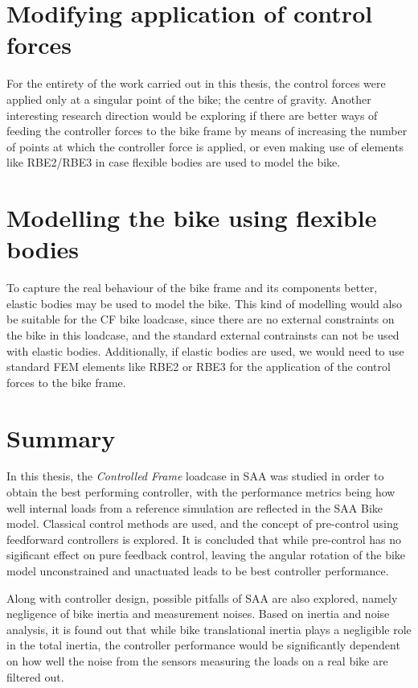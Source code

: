  \section{Modifying application of control forces}
 For the entirety of the work carried out in this thesis, the control forces were applied only at a singular point of the bike; the centre of gravity. Another interesting research direction would be exploring if there are better ways of feeding the controller forces to the bike frame by means of increasing the number of points at which the controller force is applied, or even making use of elements like RBE2/RBE3 in case flexible bodies are used to model the bike.
 
 \section{Modelling the bike using flexible bodies}
 To capture the real behaviour of the bike frame and its components better, elastic bodies may be used to model the bike. This kind of modelling would also be suitable for the CF bike loadcase, since there are no external constraints on the bike in this loadcase, and the standard external contrainsts can not be used with elastic bodies. Additionally, if elastic bodies are used, we would need to use standard FEM elements like RBE2 or RBE3 for the application of the control forces to the bike frame. 
 
 \section{Summary}
 In this thesis, the \emph{Controlled Frame} loadcase in SAA was studied in order to obtain the best performing controller, with the performance metrics being how well internal loads from a reference simulation are reflected in the SAA Bike model. Classical control methods are used, and the concept of pre-control using feedforward controllers is explored. It is concluded that while pre-control has no sigificant effect on pure feedback control, leaving the angular rotation of the bike model unconstrained and unactuated leads to be best controller performance.
 
 Along with controller design, possible pitfalls of SAA are also explored, namely negligence of bike inertia and measurement noises. Based on inertia and noise analysis, it is found out that while bike translational inertia plays a negligible role in the total inertia, the controller performance would be significantly dependent on how well the noise from the sensors measuring the loads on a real bike are filtered out.
 